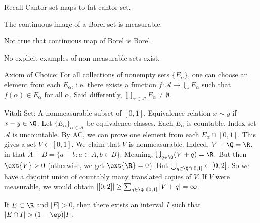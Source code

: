 

Recall Cantor set maps to fat cantor set. 



\begin{thm}
The continuous image of a Borel set is measurable. 
\end{thm}



Not true that continuous map of Borel is Borel. 


No explicit examples of non-measurable sets exist. 


Axiom of Choice: For all collections of nonempty sets $\{E_\alpha\}$, one can choose an element from each $E_\alpha$, i.e. there exists a function $f: \mathcal{A} \to \bigcup E_\alpha$ such that $f(\alpha) \in E_\alpha$ for all $\alpha$. Said differently, $\prod_{\alpha \in \mathcal{A}} E_\alpha \neq \emptyset$. 



Vitali Set: A nonmeasurable subset of $[0,1]$. Equivalence relation $x \sim y$ if $x-y \in \Q$. Let $\{E_\alpha\}_{\alpha \in \mathcal{A}}$ be equivalence classes. Each $E_\alpha$ is countable. Index set $\mathcal{A}$ is uncountable. By AC, we can prove one element from each $E_\alpha \cap [0,1]$. This gives a set $V \subset [0,1]$. We claim that $V$ is nonmeasurable. Indeed, $V+\Q=\R$, in that $A \pm B =\{ a \pm b \colon a \in A, b \in B\}$. Meaning, $\bigcup_{q \in \Q} (V+q)=\R$. But then $\ext{V}>0$ (otherwise, we get $\ext{\R}=0$). But $\bigcup_{q \in \Q \cap [0,1]} \subset [0,2]$. So we have a disjoint union of countably many translated copies of $V$. If $V$ were measurable, we would obtain $|[0,2]| \geq \sum_{q \in \Q \cap [0,1]} |V+q|= \infty$. 



\begin{lem} \label{lem:density}
If $E \subset \R$ and $|E|>0$, then there exists an interval $I$ such that $|E \cap I|> (1-\ep) |I|$. 
\end{lem}

